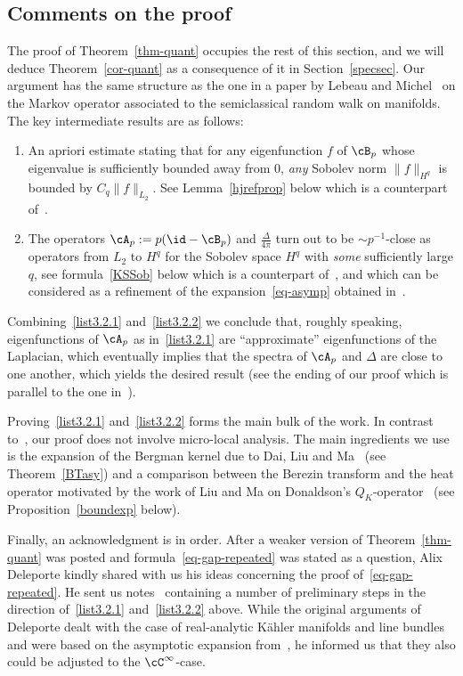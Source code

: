 \subsection{Comments on the proof}\label{subsec-comments}
The proof of Theorem~\ref{thm-quant} occupies the rest of this section, and we will deduce Theorem~\ref{cor-quant} as a consequence of it in Section~\ref{specsec}. Our argument has the same structure as the one in a paper by Lebeau and Michel~\cite{LM} on the Markov operator associated to the semiclassical random walk on manifolds. The key intermediate results are as follows:
\begin{enumerate}\romanenumi
\item \label{list3.2.1}An apriori estimate stating that for any eigenfunction $f$ of $\cB_p$ whose eigenvalue is sufficiently bounded away from $0$, \emph{any} Sobolev norm $\|f\|_{H^q}$ is bounded by $C_q \|f\|_{L_2}$. See Lemma~\ref{hjrefprop} below which is a counterpart of~\cite[Lemma~5]{LM}.
\item \label{list3.2.2}The operators $\cA_p:= p(\id-\cB_p)$ and $\frac{\Delta}{4\pi}$ turn out to be $\sim p^{-1}$-close as operators from $L_2$ to $H^q$ for the Sobolev space $H^q$ with \emph{some} sufficiently large $q$, see formula~\eqref{KSSob} below which is a counterpart of~\cite[formula (3.28)]{LM}, and which can be considered as a refinement of the expansion~\eqref{eq-asymp} obtained in~\cite{KS01}.
\end{enumerate}
Combining~\eqref{list3.2.1} and~\eqref{list3.2.2} we conclude that, roughly speaking, eigenfunctions of $\cA_p$ as in~\eqref{list3.2.1} are ``approximate'' eigenfunctions of the Laplacian, which eventually implies that the spectra of $\cA_p$ and $\Delta$ are close to one another, which yields the desired result (see the ending of our proof which is parallel to the one in~\cite{LM}).

Proving~\eqref{list3.2.1} and~\eqref{list3.2.2} forms the main bulk of the work. In contrast to~\cite{LM}, our proof does not involve micro-local analysis. The main ingredients we use is the expansion of the Bergman kernel due to Dai, Liu and Ma~\cite{DLM06} (see Theorem~\ref{BTasy}) and a comparison between the Berezin transform and the heat operator motivated by the work of Liu and Ma on Donaldson's $Q_K$-operator~\cite{LM07} (see Proposition~\ref{boundexp} below).

Finally, an acknowledgment is in order. After a weaker version of Theorem~\ref{thm-quant} was posted and formula~\eqref{eq-gap-repeated} was stated as a question, Alix Deleporte kindly shared with us his ideas concerning the proof of~\eqref{eq-gap-repeated}. He sent us notes~\cite{Deleporte} containing a number of preliminary steps in the direction of~\eqref{list3.2.1} and~\eqref{list3.2.2} above. While the original arguments of Deleporte dealt with the case of real-analytic K\"ahler manifolds and line bundles and were based on the asymptotic expansion from~\cite{Rouby, Deleporte}, he informed us that they also could be adjusted to the $\cC^\infty$-case.


